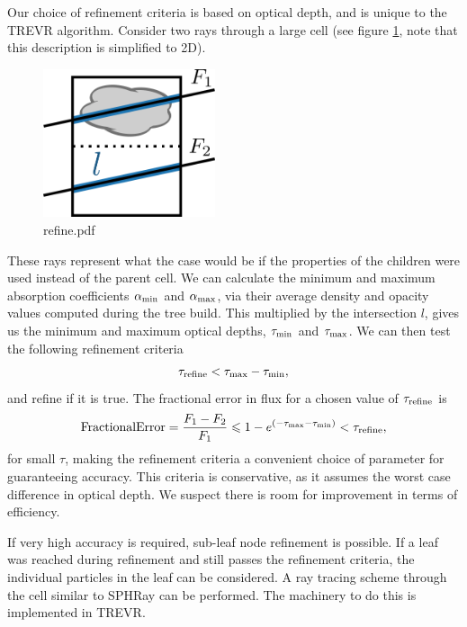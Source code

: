 \documentclass[fleqn,usenatbib]{mnras}
\newcommand{\acro}{TREVR}
\begin{document}
Our choice of refinement criteria is based on optical depth, and is unique to 
the \acro{} algorithm. Consider two rays through a large cell (see figure 
\ref{fig:refine}, note that this description is simplified to 2D).
\begin{figure}
\includegraphics[width=0.45\textwidth]{Figures/refine.png}
\caption{refine.pdf}
\label{fig:refine}
\end{figure}
These rays represent what the case would be if the properties of the children 
were used instead of the parent cell. We can calculate the minimum and maximum 
absorption coefficients $\alpha_{\rm min}$ and $\alpha_{\rm max}$, via their 
average density and opacity values computed during the tree build. This 
multiplied by the intersection $l$, gives us the minimum and maximum optical 
depths, $\tau_{\rm min}$ and $\tau_{\rm max}$. We can then test the following 
refinement criteria
\begin{equation}
\tau_{\rm refine} < \tau_{\rm max} - \tau_{\rm min},
\end{equation}
and refine if it is true. The fractional error in flux for a chosen value of 
$\tau_{\rm refine}$ is 
\begin{equation}
{\rm Fractional Error} = \frac{F_1-F_2}{F_1} \leq 1 - e^{(-\tau_{\rm max} - 
\tau_{\rm min})} < \tau_{\rm refine},
\end{equation}
for small $\tau$, making the refinement criteria a convenient choice of 
parameter for guaranteeing accuracy.  This criteria is conservative, as it 
assumes the worst case difference in optical depth. We suspect there is room 
for improvement in terms of efficiency.

If very high accuracy is required, sub-leaf node refinement is possible. If a 
leaf was reached during refinement and still passes the refinement criteria, 
the individual particles in the leaf can be considered. A ray tracing scheme 
through the cell similar to SPHRay \citep{altayEt08} can be performed. 
The machinery to do this is implemented in \acro{}.
\end{document}
